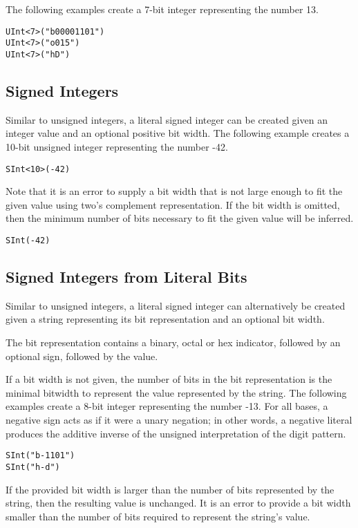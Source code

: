 \documentclass[12pt]{article}
\begin{document}
The following examples create a 7-bit integer representing the number 13.
\begin{lstlisting}
UInt<7>("b00001101")
UInt<7>("o015")
UInt<7>("hD")
\end{lstlisting}

\subsection{Signed Integers}

Similar to unsigned integers, a literal signed integer can be created given an integer value and an optional positive bit width. The following example creates a 10-bit unsigned integer representing the number -42.
\begin{lstlisting}
SInt<10>(-42)
\end{lstlisting}

Note that it is an error to supply a bit width that is not large enough to fit the given value using two's complement representation. If the bit width is omitted, then the minimum number of bits necessary to fit the given value will be inferred.
\begin{lstlisting}
SInt(-42)
\end{lstlisting}

\subsection{Signed Integers from Literal Bits}

Similar to unsigned integers, a literal signed integer can alternatively be created given a string representing its bit representation and an optional bit width.

The bit representation contains a binary, octal or hex indicator, followed by an optional sign, followed by the value.

If a bit width is not given, the number of bits in the bit representation is the minimal bitwidth to represent the value represented by the string. The following examples create a 8-bit integer representing the number -13. For all bases, a negative sign acts as if it were a unary negation; in other words, a negative literal produces the additive inverse of the unsigned interpretation of the digit pattern.
\begin{lstlisting}
SInt("b-1101")
SInt("h-d")
\end{lstlisting}

If the provided bit width is larger than the number of bits represented by the string, then the resulting value is unchanged.
It is an error to provide a bit width smaller than the number of bits required to represent the string's value.
\end{document}
